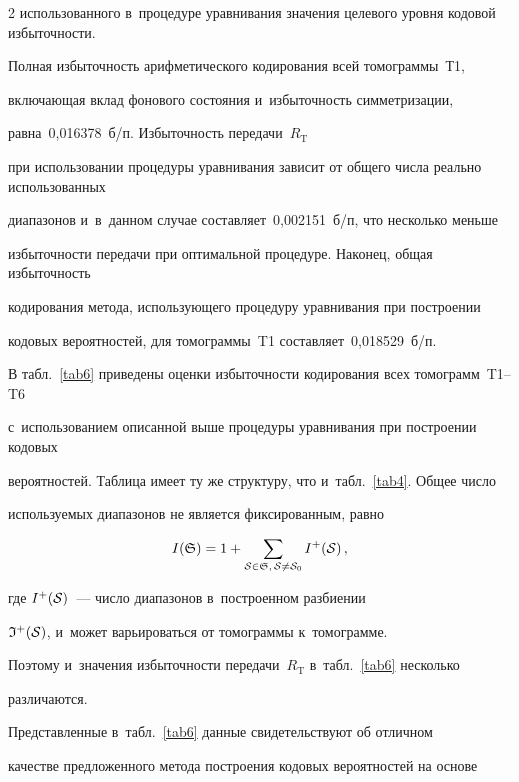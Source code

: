 \begin{multicols}{2}
использованного в~процедуре уравнивания значения целевого уровня кодовой избыточности. 

Полная избыточность арифметического кодирования всей томограммы~Т1, 

включающая вклад фонового состояния и~избыточность симметризации, 

равна~0,016378~б/п. Избыточность передачи~$R_{\mathrm{T}}$ 

при использовании процедуры уравнивания зависит от общего числа реально использованных 

диапазонов и~в~данном случае составляет~0,002151~б/п, что несколько меньше 

избыточности передачи при оптимальной процедуре. Наконец, общая избыточность 

кодирования метода, использующего процедуру уравнивания при построении 

кодовых вероятностей, для томограммы~T1 со\-став\-ля\-ет~0,018529~б/п.



В табл.~\ref{tab6} приведены оценки избыточности кодирования всех томограмм~T1--T6 

с~использованием описанной выше процедуры уравнивания при построении кодовых 

вероятностей. Таблица имеет ту же структуру, что и~табл.~\ref{tab4}. Общее число 

используемых диапазонов не является фиксированным, равно



\noindent

$$

 I(\frak S) =1 +  \sum\limits_{{\cal S}\in{\frak S},\, {\cal S}\neq{\cal S}_0} 

 I^+({\cal S})\,,

$$

где $I^+({\cal S})$~--- число диапазонов в~построенном разбиении 

${\frak I}^+({\cal S})$, и~может варьироваться от томограммы к~томограмме. 

Поэтому и~значения избыточности передачи~$R_{\mathrm{T}}$ в~табл.~\ref{tab6} несколько 

различаются.







Представленные в~табл.~\ref{tab6} данные свидетельствуют об отличном 

качестве предложенного метода построения кодовых вероятностей на основе 


\end{multicols}
